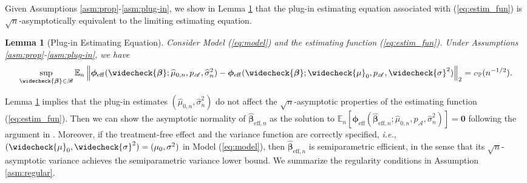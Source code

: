 \documentclass[11pt]{article}
\newtheorem{lem}{Lemma}
\theoremstyle{definition}
\theoremstyle{remark}
\newcommand{\bbeta}{\bm{\beta}}
\newcommand{\bphi}{\bm{\phi}}
\newcommand{\bbE}{\mathbb{E}}
\newcommand{\bbP}{\mathbb{P}}
\newcommand{\sA}{\mathscr{A}}
\newcommand{\sB}{\mathscr{B}}
\newcommand\smallcO{
	\mathchoice
	{{\scriptscriptstyle\mathcal{O}}}%
	{{\scriptscriptstyle\mathcal{O}}}%
	{{\scriptscriptstyle\mathcal{O}}}%
	{\scalebox{.5}{$\scriptscriptstyle\mathcal{O}$}}%
}
\newcommand{\bzero}{\mathbf{0}}	%
\newcommand{\eff}{\mathrm{eff}}
\begin{document}
\noindent Given Assumptions \ref{asm:prop}-\ref{asm:plug-in}, we show in Lemma \ref{lem:plug-in} that the plug-in estimating equation associated with (\ref{eq:estim_fun}) is $ \sqrt{n} $-asymptotically equivalent to the limiting estimating equation. 
\begin{lem}[Plug-in Estimating Equation]\label{lem:plug-in}
	Consider Model (\ref{eq:model}) and the estimating function (\ref{eq:estim_fun}). Under Assumptions \ref{asm:prop}-\ref{asm:plug-in}, we have
	\[ \sup_{\widecheck{\bbeta} \in \sB} \bbE_{n}\left\| \bphi_{\eff}(\widecheck{\bbeta};\widehat{\mu}_{0,n},p_{\sA},\widehat{\sigma}_{n}^{2}) - \bphi_{\eff}(\widecheck{\bbeta};\widecheck{\mu}_{0},p_{\sA},\widecheck{\sigma}^{2}) \right\|_{2} = \smallcO_{\bbP}(n^{-1/2}). \]
\end{lem}

\noindent Lemma \ref{lem:plug-in} implies that the plug-in estimates $ (\widehat{\mu}_{0,n},\widehat{\sigma}_{n}^{2}) $ do not affect the $ \sqrt{n} $-asymptotic properties of the estimating function (\ref{eq:estim_fun}). Then we can show the asymptotic normality of $ \widehat{\bbeta}_{\eff,n} $ as the solution to $ \bbE_{n}[\bphi_{\eff}(\widehat{\bbeta}_{\eff,n};\widehat{\mu}_{0,n},p_{\sA},\widehat{\sigma}_{n}^{2})] = \bzero $ following the argument in \citet{newey1994asymptotic}. Moreover, if the treatment-free effect and the variance function are correctly specified, \textit{i.e.}, $ (\widecheck{\mu}_{0},\widecheck{\sigma}^{2}) = (\mu_{0},\sigma^{2}) $ in Model (\ref{eq:model}), then $ \widehat{\bbeta}_{\eff,n} $ is semiparametric efficient, in the sense that its $ \sqrt{n} $-asymptotic variance achieves the semiparametric variance lower bound. We summarize the regularity conditions in Assumption \ref{asm:regular}.
\end{document}
